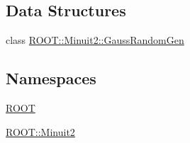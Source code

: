 \subsection*{Data Structures}
\begin{DoxyCompactItemize}
\item 
class \mbox{\hyperlink{classROOT_1_1Minuit2_1_1GaussRandomGen}{R\+O\+O\+T\+::\+Minuit2\+::\+Gauss\+Random\+Gen}}
\end{DoxyCompactItemize}
\subsection*{Namespaces}
\begin{DoxyCompactItemize}
\item 
 \mbox{\hyperlink{namespaceROOT}{R\+O\+OT}}
\item 
 \mbox{\hyperlink{namespaceROOT_1_1Minuit2}{R\+O\+O\+T\+::\+Minuit2}}
\end{DoxyCompactItemize}
